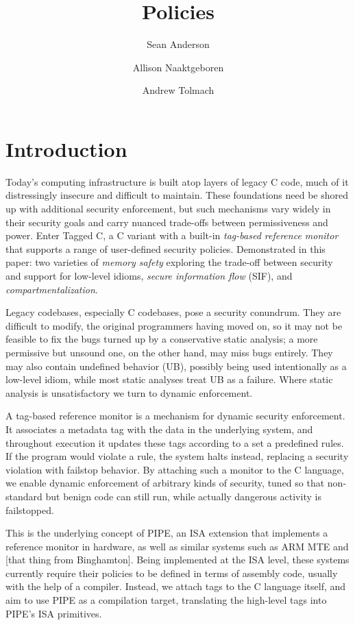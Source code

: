 \documentclass[acmsmall,review,anonymous]{acmart}\settopmatter{printfolios=true,printccs=false,printacmref=false}
\title{Policies}
\author{Sean Anderson}
\affiliation{
  \department{Computer Science}
  \institution{Portland State University}
}
\author{Allison Naaktgeboren}
\affiliation{
  \department{Computer Science}
  \institution{Portland State University}
}
\author{Andrew Tolmach}
\affiliation{
  \department{Computer Science}
  \institution{Portland State University}
}
\begin{document}
\maketitle




\section{Introduction}

Today's computing infrastructure is built atop layers of legacy C code, much of it distressingly
insecure and difficult to maintain. These foundations need be shored up with additional security
enforcement, but such mechanisms vary widely in their security goals and carry nuanced trade-offs
between permissiveness and power. Enter Tagged C, a C variant with a built-in
{\em tag-based reference monitor} that supports a range of user-defined security policies.
Demonstrated in this paper: two varieties of {\em memory safety} exploring the trade-off between
security and support for low-level idioms, {\em secure information flow} (SIF),
and {\em compartmentalization}.

Legacy codebases, especially C codebases, pose a security conundrum. They are difficult to
modify, the original programmers having moved on, so it may not be feasible to fix the bugs
turned up by a conservative static analysis; a more permissive but unsound one, on the other hand,
may miss bugs entirely. They may also contain undefined behavior (UB), possibly being used intentionally
as a low-level idiom, while most static analyses treat UB as a failure. Where static analysis
is unsatisfactory we turn to dynamic enforcement.

A tag-based reference monitor is a mechanism for dynamic security enforcement. It associates
a metadata tag with the data in the underlying system, and throughout execution it updates these
tags according to a set a predefined rules. If the program would violate a rule, the system halts
instead, replacing a security violation with failstop behavior. By attaching such a monitor to
the C language, we enable dynamic enforcement of arbitrary kinds of security, tuned so that
non-standard but benign code can still run, while actually dangerous activity is failstopped.

This is the underlying concept of PIPE, an ISA extension that implements a reference monitor in
hardware, as well as similar systems such as ARM MTE and [that thing from Binghamton]. Being
implemented at the ISA level, these systems currently require their policies to be defined in terms of
assembly code, usually with the help of a compiler. Instead, we attach tags to the C language
itself, and aim to use PIPE as a compilation target, translating the high-level tags into
PIPE's ISA primitives.
\end{document}
